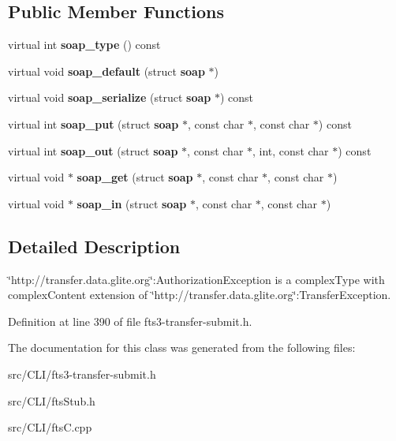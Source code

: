 \subsection*{Public Member Functions}
\begin{DoxyCompactItemize}
\item 
virtual int {\bfseries soap\_\-type} () const \label{classtransfer____AuthorizationException_adc826c75f287d7cff21aa9579d72bc89}

\item 
virtual void {\bfseries soap\_\-default} (struct {\bf soap} $\ast$)\label{classtransfer____AuthorizationException_adba3bf62da124e308aea6c7c3c59558e}

\item 
virtual void {\bfseries soap\_\-serialize} (struct {\bf soap} $\ast$) const \label{classtransfer____AuthorizationException_a77409bce93bdcc9bca745b15cf8fc9bb}

\item 
virtual int {\bfseries soap\_\-put} (struct {\bf soap} $\ast$, const char $\ast$, const char $\ast$) const \label{classtransfer____AuthorizationException_ac5666af2a4a9b19689c524a8b5048e8d}

\item 
virtual int {\bfseries soap\_\-out} (struct {\bf soap} $\ast$, const char $\ast$, int, const char $\ast$) const \label{classtransfer____AuthorizationException_aad725d8d5946bba867a986cb867c6faa}

\item 
virtual void $\ast$ {\bfseries soap\_\-get} (struct {\bf soap} $\ast$, const char $\ast$, const char $\ast$)\label{classtransfer____AuthorizationException_a92bd05123a85131551627807473ff8bb}

\item 
virtual void $\ast$ {\bfseries soap\_\-in} (struct {\bf soap} $\ast$, const char $\ast$, const char $\ast$)\label{classtransfer____AuthorizationException_ad3a77ae0706255a3a7ec445ae04d86d6}

\end{DoxyCompactItemize}


\subsection{Detailed Description}
\char`\"{}http://transfer.data.glite.org\char`\"{}:AuthorizationException is a complexType with complexContent extension of \char`\"{}http://transfer.data.glite.org\char`\"{}:TransferException. 

Definition at line 390 of file fts3-\/transfer-\/submit.h.



The documentation for this class was generated from the following files:\begin{DoxyCompactItemize}
\item 
src/CLI/fts3-\/transfer-\/submit.h\item 
src/CLI/ftsStub.h\item 
src/CLI/ftsC.cpp\end{DoxyCompactItemize}
